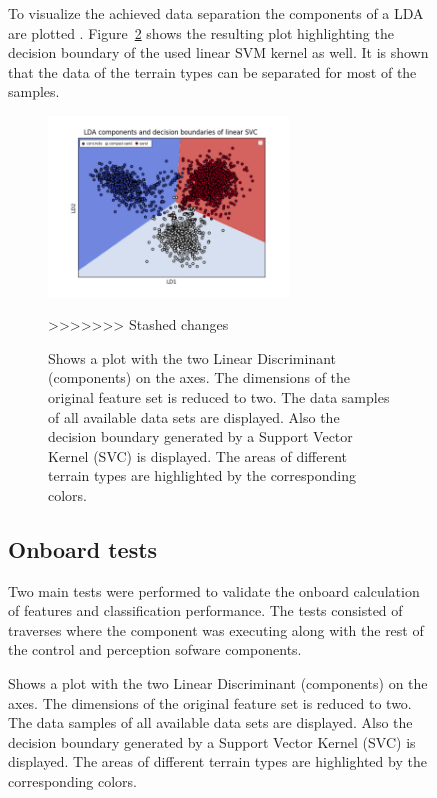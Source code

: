 \documentclass{article}
\begin{document}
\begin{figure}[!htb]
To visualize the achieved data separation the components of a LDA are plotted . Figure~\ref{fig:lda} shows the resulting plot highlighting the decision boundary of the used linear SVM kernel as well. It is shown that the data of the terrain types can be separated for most of the samples.
\begin{figure}[!htb]
 \centering
 \includegraphics[width=0.7\textwidth]{../figures/boundary_LDA_prevTesting_all_sand_concrete_compactsand.png}
 \caption{Shows a plot with the two Linear Discriminant (components) on the axes. The dimensions of the original feature set is reduced to two. The data samples of all available data sets are displayed. Also the decision boundary generated by a Support Vector Kernel (SVC) is displayed. The areas of different terrain types are highlighted by the corresponding colors. }
 \label{fig:lda}
>>>>>>> Stashed changes
\end{figure}



\subsection{Onboard tests}

Two main tests were performed to validate the onboard calculation of features and classification performance.
The tests consisted of traverses where the component was executing along with the rest of the control and perception sofware components. 


\end{figure}
\end{document}
